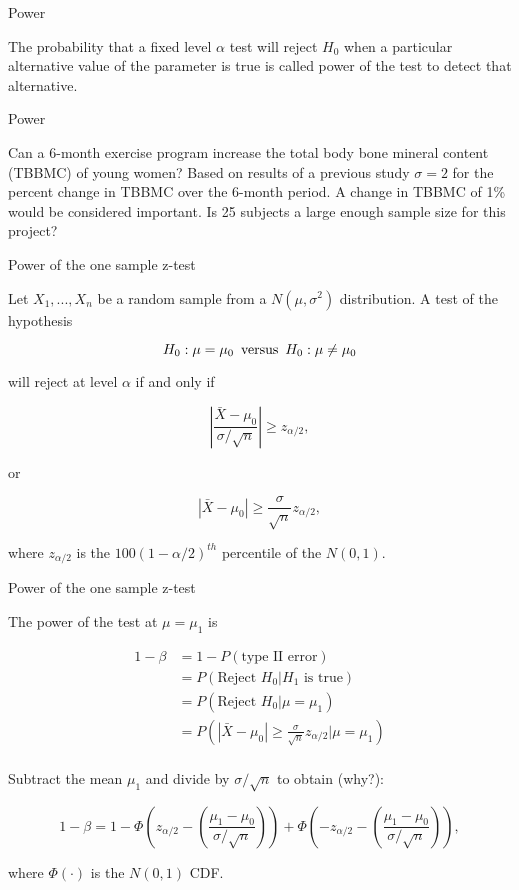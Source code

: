 \documentclass[ignorenonframetext,]{beamer}
\begin{document}
\begin{frame}{Power}

The probability that a fixed level \(\alpha\) test will reject \(H_0\)
when a particular alternative value of the parameter is true is called
power of the test to detect that alternative.

\end{frame}

\begin{frame}{Power}

Can a 6-month exercise program increase the total body bone mineral
content (TBBMC) of young women? Based on results of a previous study
\(\sigma=2\) for the percent change in TBBMC over the 6-month period. A
change in TBBMC of 1\% would be considered important. Is 25 subjects a
large enough sample size for this project?

\end{frame}

\begin{frame}{Power of the one sample z-test}

Let \(X_1,...,X_n\) be a random sample from a \(N(\mu,\sigma^2)\)
distribution. A test of the hypothesis

\[H_0:\mu=\mu_0 \thinspace \text{ versus } \thinspace H_0:\mu \ne \mu_0 \]

will reject at level \(\alpha\) if and only if

\[ \left|\frac{{\bar X} - \mu_0}{\sigma/{\sqrt{n}}} \right| \ge z_{\alpha/2},\]

or

\[ \left|{\bar X} -\mu_0 \right| \ge \frac{\sigma}{\sqrt{n}} z_{\alpha/2},\]

where \(z_{\alpha/2}\) is the \(100(1-\alpha/2)^{th}\) percentile of the
\(N(0,1)\).

\end{frame}

\begin{frame}{Power of the one sample z-test}

The power of the test at \(\mu=\mu_1\) is

\[\begin{aligned}
1-\beta &= 1-P\left(\text{type II error}\right) \\
        &= P\left(\text{Reject } H_0|H_1 \text{ is true}\right) \\
        &= P\left(\text{Reject } H_0|\mu=\mu_1\right) \\
        &= P\left(\left|{\bar X} -\mu_0 \right| \ge \frac{\sigma}{\sqrt{n}} z_{\alpha/2}|\mu=\mu_1\right) \\
\end{aligned}\]

Subtract the mean \(\mu_1\) and divide by \(\sigma/\sqrt{n}\) to obtain
(why?):

\[ 1-\beta=1-\Phi\left( z_{\alpha/2}-\left(\frac{\mu_1-\mu_0}{\sigma/\sqrt{n}}\right) \right)+\Phi\left( -z_{\alpha/2}-\left(\frac{\mu_1-\mu_0}{\sigma/\sqrt{n}}\right) \right),\]

where \(\Phi(\cdot)\) is the \(N(0,1)\) CDF.

\end{frame}
\end{document}
